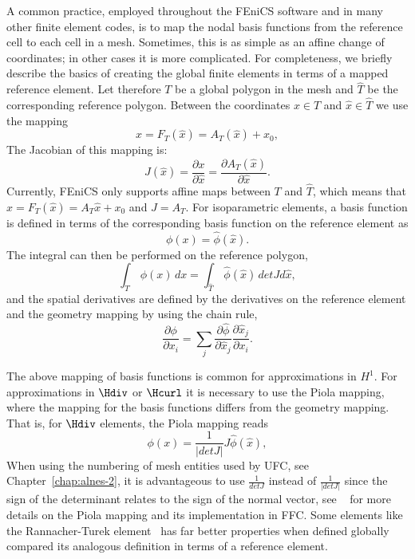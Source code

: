 A common practice, employed throughout the FEniCS
software and in many other finite element codes, is to map the nodal
basis functions from the reference cell to each cell in a mesh.
Sometimes, this is as simple as an affine change of coordinates; in
other cases it is more complicated.
For completeness, we briefly describe the basics of creating the global finite elements in terms of a mapped
reference element. Let therefore $T$ be a global polygon in the mesh and $\hat{T}$ be the corresponding reference polygon.
Between the coordinates
$x\in T$ and $\hat x\in\hat T$ we use the mapping
\begin{equation}
\label{eq:geometry}
x = F_T(\hat x) = A_T(\hat x)  + x_0,
\end{equation}
The Jacobian of this mapping is: 
\begin{equation}
\label{eq:geometry2}
J(\hat x) =  \frac{\partial x }{\partial \hat x}  =    \frac{\partial A_T(\hat x) }{\partial \hat x} .
\end{equation}
Currently, FEniCS only supports affine maps between $T$ and $\hat{T}$, which means that 
$x = F_T(\hat x) = A_T\hat x  + x_0$ and $J=A_T$.
For isoparametric elements, a basis function is defined in terms of the corresponding basis function
on the reference element as
\begin{equation}
\label{eq:subs}
\phi(x) = \hat{\phi}(\hat x). 
\end{equation}
The integral can then be performed on the reference polygon,
\begin{equation}
\label{eq:integration2}
\int_T \, \phi (x) \, dx = \int_{\hat{T}} \, \hat \phi (\hat x) \, detJ d\hat x ,
\end{equation}
and the spatial derivatives are defined by the derivatives on the
reference element and the geometry mapping by using the
chain rule,
\begin{equation}
\label{eq:chain}
\frac{\partial \phi}{\partial x_i} =
\sum_j \frac{\partial \hat \phi}{\partial \hat x_j} \frac{\partial \hat x_j }{\partial x_i }  .
\end{equation}

The above mapping of basis functions is common for approximations in $H^1$. For approximations in $\Hdiv$ or
$\Hcurl$ it is necessary to use the Piola mapping, where the mapping for the basis functions
differs from the geometry mapping. That is, for $\Hdiv$ elements, the Piola mapping reads  
\begin{equation}
\label{eq:subs}
\phi(x) = \frac{1}{|detJ|} J \hat{\phi}(\hat x),
\end{equation}
When using the numbering of mesh entities used by UFC, see Chapter~\ref{chap:alnes-2}, it is advantageous to use $\frac{1}{detJ}$ instead of $\frac{1}{|detJ|}$ since the sign of the determinant relates to the sign of the normal vector,     
see ~\citep{RognesKirbyLogg2009} for more details on the Piola mapping and its implementation in FFC.   
Some elements like the Rannacher-Turek element~\citep{Turek1999,RannacherTurek1992} has far better
properties when defined globally compared its analogous definition in terms
of a reference element.


